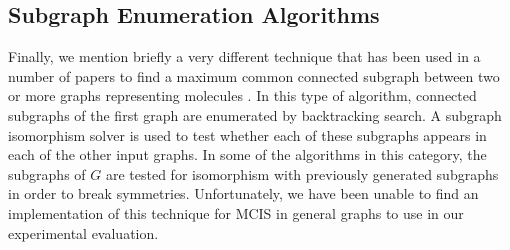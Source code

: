 \subsection{Subgraph Enumeration Algorithms}

Finally, we mention briefly a very different technique that has been used
in a number of papers to find a maximum common connected subgraph between two or more
graphs representing molecules
\citep{armitage1967automatic,takahashi1987recognition,DBLP:journals/jcheminf/DalkeH13}.
In this type of algorithm, connected
subgraphs of the first graph are enumerated by backtracking search.
A subgraph isomorphism solver is used to test whether each of these subgraphs
appears in each of the other input graphs.  In some of the algorithms
in this category,
the subgraphs of $G$ are tested for isomorphism with previously generated subgraphs
in order to break symmetries.
Unfortunately, we have been unable to find an implementation of this technique
for MCIS in general graphs to use in our experimental evaluation.


